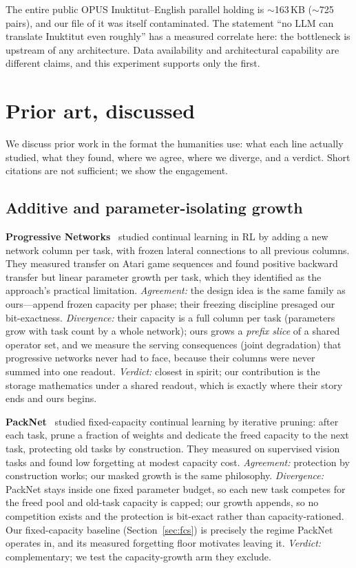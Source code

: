 \documentclass[11pt]{article}
\theoremstyle{definition}\newtheorem{definition}{Definition}
\theoremstyle{remark}\newtheorem{remark}{Remark}
\begin{document}
The entire public OPUS Inuktitut--English parallel holding is $\sim$163\,KB ($\sim$725
pairs), and our file of it was itself contaminated. The statement ``no LLM can translate
Inuktitut even roughly'' has a measured correlate here: the bottleneck is upstream of any
architecture. Data availability and architectural capability are different claims, and
this experiment supports only the first.

\section{Prior art, discussed}
\label{sec:prior}

We discuss prior work in the format the humanities use: what each line actually studied,
what they found, where we agree, where we diverge, and a verdict. Short citations are not
sufficient; we show the engagement.

\subsection{Additive and parameter-isolating growth}
\label{sec:prior:growth}

\textbf{Progressive Networks}~\cite{pgn} studied continual learning in RL by adding a
new network column per task, with frozen lateral connections to all previous columns.
They measured transfer on Atari game sequences and found positive backward transfer but
linear parameter growth per task, which they identified as the approach's practical
limitation. \emph{Agreement:} the design idea is the same family as ours---append frozen
capacity per phase; their freezing discipline presaged our bit-exactness. \emph{Divergence:}
their capacity is a full column per task (parameters grow with task count by a whole
network); ours grows a \emph{prefix slice} of a shared operator set, and we measure the
serving consequences (joint degradation) that progressive networks never had to face,
because their columns were never summed into one readout. \emph{Verdict:} closest in
spirit; our contribution is the storage mathematics under a shared readout, which is
exactly where their story ends and ours begins.

\textbf{PackNet}~\cite{packnet} studied fixed-capacity continual learning by iterative
pruning: after each task, prune a fraction of weights and dedicate the freed capacity to
the next task, protecting old tasks by construction. They measured on supervised vision
tasks and found low forgetting at modest capacity cost. \emph{Agreement:} protection by
construction works; our masked growth is the same philosophy. \emph{Divergence:} PackNet
stays inside one fixed parameter budget, so each new task competes for the freed pool and
old-task capacity is capped; our growth appends, so no competition exists and the
protection is bit-exact rather than capacity-rationed. Our fixed-capacity baseline
(Section~\ref{sec:fcs}) is precisely the regime PackNet operates in, and its
measured forgetting floor motivates leaving it. \emph{Verdict:} complementary; we test the
capacity-growth arm they exclude.
\end{document}
